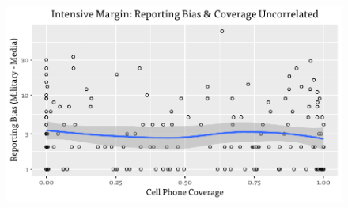 \documentclass[article,36pt,extrafontsizes,oneside,openany,oldfontcommands]{memoir}
\begin{document}
\begin{adjmulticols*}{3}{0.5in}{0.5in}



\begin{figure}
\centering
\includegraphics[width=\linewidth]{intensive.pdf}
\end{figure}


% 
% 


\end{adjmulticols*}
\end{document}
